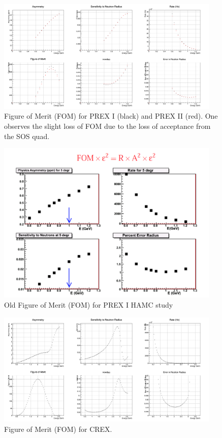 \documentclass[11pt]{amsart}
\begin{document}
\begin{figure}
  \includegraphics[width=0.95\textwidth]{plots/fom_p.png}
  \caption{Figure of Merit (FOM) for PREX I (black) and PREX II (red). One observes the slight loss of FOM due to the loss of acceptance from the SOS quad.}
\end{figure}

\begin{figure}
  \includegraphics[width=0.95\textwidth]{plots/fom_old.png}
  \caption{Old Figure of Merit (FOM) for PREX I HAMC study}
\end{figure}

\begin{figure}
\includegraphics[width=0.95\textwidth]{plots/fom_c.png}
\caption{Figure of Merit (FOM) for CREX.}
\end{figure}
\FloatBarrier
\end{document}
